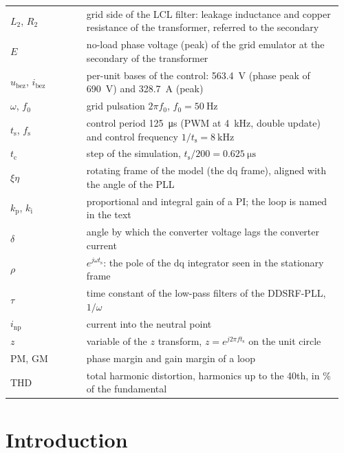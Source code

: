 \documentclass[11pt,a4paper]{scrartcl}
\newcommand{\ped}[1]{_{\mathrm{#1}}}
\begin{document}
\begin{onehalfspace}
\begin{longtable}{@{} >{\raggedright\arraybackslash}p{0.22\linewidth} p{0.74\linewidth} @{}}
	$L_2$, $R_2$ & grid side of the LCL filter: leakage inductance and copper resistance of the transformer, referred to the secondary \\
	$E$ & no-load phase voltage (peak) of the grid emulator at the secondary of the transformer \\
	$u\ped{bez}$, $i\ped{bez}$ & per-unit bases of the control: \SI{563.4}{\volt} (phase peak of \SI{690}{\volt}) and \SI{328.7}{\ampere} (peak) \\
	$\omega$, $f\ped{0}$ & grid pulsation $2\pi f\ped{0}$, $f\ped{0} = \SI{50}{\hertz}$ \\
	$t\ped{s}$, $f\ped{s}$ & control period \SI{125}{\micro\second} (PWM at \SI{4}{\kilo\hertz}, double update) and control frequency $1/t\ped{s} = \SI{8}{\kilo\hertz}$ \\
	$t\ped{c}$ & step of the simulation, $t\ped{s}/200 = \SI{0.625}{\micro\second}$ \\
	$\xi\eta$ & rotating frame of the model (the dq frame), aligned with the angle of the PLL \\
	$k\ped{p}$, $k\ped{i}$ & proportional and integral gain of a PI; the loop is named in the text \\
	$\delta$ & angle by which the converter voltage lags the converter current \\
	$\rho$ & $e^{j\omega t\ped{s}}$: the pole of the dq integrator seen in the stationary frame \\
	$\tau$ & time constant of the low-pass filters of the DDSRF-PLL, $1/\omega$ \\
	$i\ped{np}$ & current into the neutral point \\
	$z$ & variable of the $z$ transform, $z = e^{j2\pi f t\ped{s}}$ on the unit circle \\
	PM, GM & phase margin and gain margin of a loop \\
	THD & total harmonic distortion, harmonics up to the 40th, in \% of the fundamental \\
\end{longtable}
\endgroup
\addtocounter{table}{-1}

\section{Introduction}
\label{sec:intro}


\end{onehalfspace}
\end{document}
